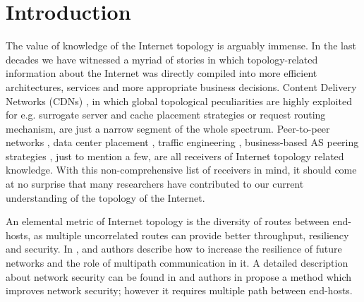 \documentclass[peerreview]{IEEEtran}
\begin{document}
\section{Introduction}

The value of knowledge of the Internet topology is arguably immense. In the last
decades we have witnessed a myriad of stories in which topology-related
information about the Internet was directly compiled into more efficient
architectures, services and more appropriate business decisions. Content
Delivery Networks (CDNs) \cite{pathan2008taxonomy}, in which global topological
peculiarities are highly exploited for e.g. surrogate server and cache placement
strategies or request routing mechanism, are just a narrow segment of the whole
spectrum. Peer-to-peer networks \cite{castro2003topology,lua2005survey}, data
center placement \cite{greenberg2008cost}, traffic engineering
\cite{awduche2002overview}, business-based AS peering strategies
\cite{clark2011interconnection}, just to mention a few, are all receivers of
Internet topology related knowledge. With this non-comprehensive list of
receivers in mind, it should come at no surprise that many researchers have
contributed to our current understanding of the topology of the Internet.

An elemental metric of Internet topology is the diversity of routes between
end-hosts, as multiple uncorrelated routes can provide better throughput,
resiliency and security. In \cite{sterbenz2010resilience},
\cite{sterbenz2013evaluation} and \cite{rak2015resilient} authors describe how
to increase the resilience of future networks and the role of multipath
communication in it. A detailed description about network security can be found
in \cite{kaufman2002network} and authors in \cite{lou2003spread} propose a
method which improves network security; however it requires multiple path
between end-hosts.
\end{document}

